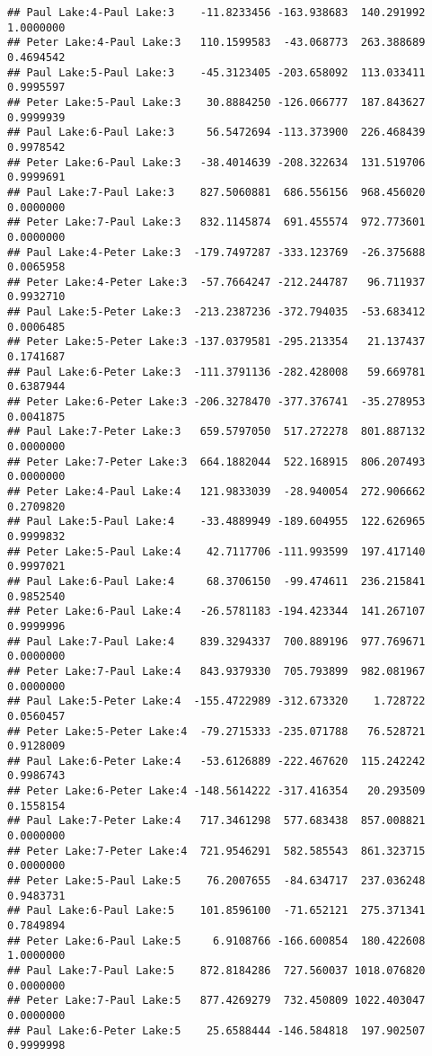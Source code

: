 \documentclass[]{article}
\begin{document}
\begin{verbatim}
## Paul Lake:4-Paul Lake:3    -11.8233456 -163.938683  140.291992 1.0000000
## Peter Lake:4-Paul Lake:3   110.1599583  -43.068773  263.388689 0.4694542
## Paul Lake:5-Paul Lake:3    -45.3123405 -203.658092  113.033411 0.9995597
## Peter Lake:5-Paul Lake:3    30.8884250 -126.066777  187.843627 0.9999939
## Paul Lake:6-Paul Lake:3     56.5472694 -113.373900  226.468439 0.9978542
## Peter Lake:6-Paul Lake:3   -38.4014639 -208.322634  131.519706 0.9999691
## Paul Lake:7-Paul Lake:3    827.5060881  686.556156  968.456020 0.0000000
## Peter Lake:7-Paul Lake:3   832.1145874  691.455574  972.773601 0.0000000
## Paul Lake:4-Peter Lake:3  -179.7497287 -333.123769  -26.375688 0.0065958
## Peter Lake:4-Peter Lake:3  -57.7664247 -212.244787   96.711937 0.9932710
## Paul Lake:5-Peter Lake:3  -213.2387236 -372.794035  -53.683412 0.0006485
## Peter Lake:5-Peter Lake:3 -137.0379581 -295.213354   21.137437 0.1741687
## Paul Lake:6-Peter Lake:3  -111.3791136 -282.428008   59.669781 0.6387944
## Peter Lake:6-Peter Lake:3 -206.3278470 -377.376741  -35.278953 0.0041875
## Paul Lake:7-Peter Lake:3   659.5797050  517.272278  801.887132 0.0000000
## Peter Lake:7-Peter Lake:3  664.1882044  522.168915  806.207493 0.0000000
## Peter Lake:4-Paul Lake:4   121.9833039  -28.940054  272.906662 0.2709820
## Paul Lake:5-Paul Lake:4    -33.4889949 -189.604955  122.626965 0.9999832
## Peter Lake:5-Paul Lake:4    42.7117706 -111.993599  197.417140 0.9997021
## Paul Lake:6-Paul Lake:4     68.3706150  -99.474611  236.215841 0.9852540
## Peter Lake:6-Paul Lake:4   -26.5781183 -194.423344  141.267107 0.9999996
## Paul Lake:7-Paul Lake:4    839.3294337  700.889196  977.769671 0.0000000
## Peter Lake:7-Paul Lake:4   843.9379330  705.793899  982.081967 0.0000000
## Paul Lake:5-Peter Lake:4  -155.4722989 -312.673320    1.728722 0.0560457
## Peter Lake:5-Peter Lake:4  -79.2715333 -235.071788   76.528721 0.9128009
## Paul Lake:6-Peter Lake:4   -53.6126889 -222.467620  115.242242 0.9986743
## Peter Lake:6-Peter Lake:4 -148.5614222 -317.416354   20.293509 0.1558154
## Paul Lake:7-Peter Lake:4   717.3461298  577.683438  857.008821 0.0000000
## Peter Lake:7-Peter Lake:4  721.9546291  582.585543  861.323715 0.0000000
## Peter Lake:5-Paul Lake:5    76.2007655  -84.634717  237.036248 0.9483731
## Paul Lake:6-Paul Lake:5    101.8596100  -71.652121  275.371341 0.7849894
## Peter Lake:6-Paul Lake:5     6.9108766 -166.600854  180.422608 1.0000000
## Paul Lake:7-Paul Lake:5    872.8184286  727.560037 1018.076820 0.0000000
## Peter Lake:7-Paul Lake:5   877.4269279  732.450809 1022.403047 0.0000000
## Paul Lake:6-Peter Lake:5    25.6588444 -146.584818  197.902507 0.9999998

\end{verbatim}
\end{document}
